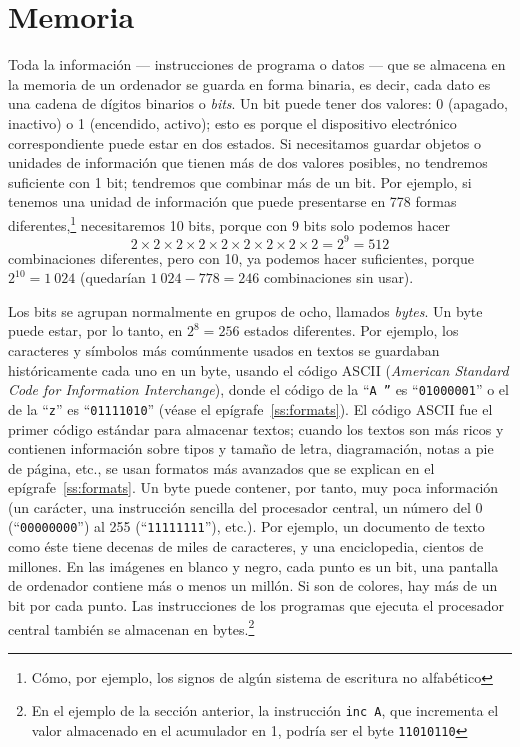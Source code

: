 \section{Memoria} \label{ss:memoria} 

Toda la información --- instrucciones de programa o datos --- que se almacena en la memoria de un ordenador se guarda en forma binaria, es decir, cada dato es una cadena de dígitos binarios o \emph{bits}. Un bit puede tener dos valores: 0 (apagado, inactivo) o 1 (encendido, activo); esto es porque el dispositivo electrónico correspondiente puede estar en dos estados. Si necesitamos guardar objetos o unidades de información que tienen más de dos valores posibles, no tendremos suficiente con 1 bit; tendremos que combinar más de un bit. Por ejemplo, si tenemos una unidad de información que puede presentarse en 778 formas diferentes,\footnote{Cómo, por ejemplo, los signos de algún sistema de escritura no alfabético} necesitaremos 10 bits, porque con 9 bits solo podemos hacer $$2 \times 2 \times 2 \times 2 \times 2 \times 2 \times 2 \times 2 \times 2 = 2^9 = 512$$ combinaciones diferentes, pero con 10, ya podemos hacer suficientes, porque $2^{10}=1~024$ (quedarían $1~024-778=246$ combinaciones sin usar). 

Los bits se agrupan normalmente en grupos de ocho, llamados \emph{bytes}. Un byte puede estar, por lo tanto, en $2^8=256$ estados diferentes. Por ejemplo, los caracteres y símbolos más comúnmente usados en textos se guardaban históricamente cada uno en un byte, usando el código ASCII\label{pg:ASCII} (\emph{American Standard Code for Information Interchange}), donde el código de la ``{\tt A ''} es ``{\tt 01000001}'' o el de la ``{\tt z}'' es ``{\tt 01111010}'' (véase el epígrafe~\ref{ss:formats}). El código ASCII fue el primer código estándar para almacenar textos; cuando los textos son más ricos y contienen información sobre tipos y tamaño de letra, diagramación, notas a pie de página, etc., se usan formatos más avanzados que se explican en el epígrafe~\ref{ss:formats}. Un byte puede contener, por tanto, muy poca información (un carácter, una instrucción sencilla del procesador central, un número del 0 (``{\tt 00000000}'') al 255 (``{\tt 11111111}''), etc.). Por ejemplo, un documento de texto como éste tiene decenas de miles de caracteres, y una enciclopedia, cientos de millones. En las imágenes en blanco y negro, cada punto es un bit, una pantalla de ordenador contiene más o menos un millón. Si son de colores, hay más de un bit por cada punto. Las instrucciones de los programas que ejecuta el procesador central también se almacenan en bytes.\footnote{En el ejemplo de la sección anterior, la instrucción {\tt inc A}, que incrementa el valor almacenado en el acumulador en 1, podría ser el byte {\tt 11010110}} 


